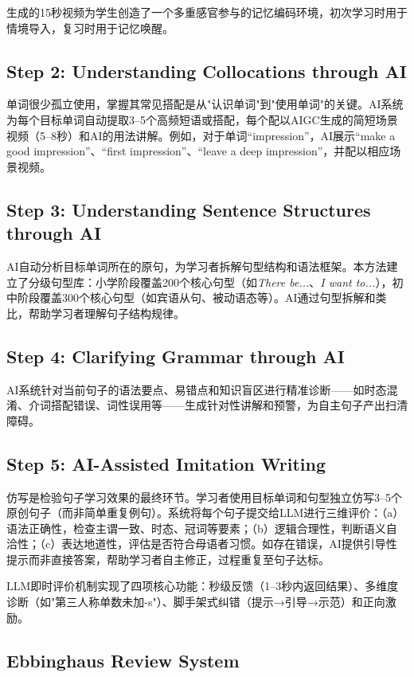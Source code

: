 \documentclass[Afour,sageapa,times]{sagej}
\begin{document}
生成的15秒视频为学生创造了一个多重感官参与的记忆编码环境，初次学习时用于情境导入，复习时用于记忆唤醒。

\subsection{Step 2: Understanding Collocations through AI}
单词很少孤立使用，掌握其常见搭配是从"认识单词"到"使用单词"的关键。AI系统为每个目标单词自动提取3--5个高频短语或搭配，每个配以AIGC生成的简短场景视频（5--8秒）和AI的用法讲解。例如，对于单词``impression''，AI展示``make a good impression''、``first impression''、``leave a deep impression''，并配以相应场景视频。

\subsection{Step 3: Understanding Sentence Structures through AI}
AI自动分析目标单词所在的原句，为学习者拆解句型结构和语法框架。本方法建立了分级句型库：小学阶段覆盖200个核心句型（如\textit{There be...}、\textit{I want to...}），初中阶段覆盖300个核心句型（如宾语从句、被动语态等）。AI通过句型拆解和类比，帮助学习者理解句子结构规律。

\subsection{Step 4: Clarifying Grammar through AI}
AI系统针对当前句子的语法要点、易错点和知识盲区进行精准诊断——如时态混淆、介词搭配错误、词性误用等——生成针对性讲解和预警，为自主句子产出扫清障碍。

\subsection{Step 5: AI-Assisted Imitation Writing}
仿写是检验句子学习效果的最终环节。学习者使用目标单词和句型独立仿写3--5个原创句子（而非简单重复例句）。系统将每个句子提交给LLM进行三维评价：（a）语法正确性，检查主谓一致、时态、冠词等要素；（b）逻辑合理性，判断语义自洽性；（c）表达地道性，评估是否符合母语者习惯。如存在错误，AI提供引导性提示而非直接答案，帮助学习者自主修正，过程重复至句子达标。

LLM即时评价机制实现了四项核心功能：秒级反馈（1--3秒内返回结果）、多维度诊断（如"第三人称单数未加-s"）、脚手架式纠错（提示→引导→示范）和正向激励。

\subsection{Ebbinghaus Review System}
\end{document}
